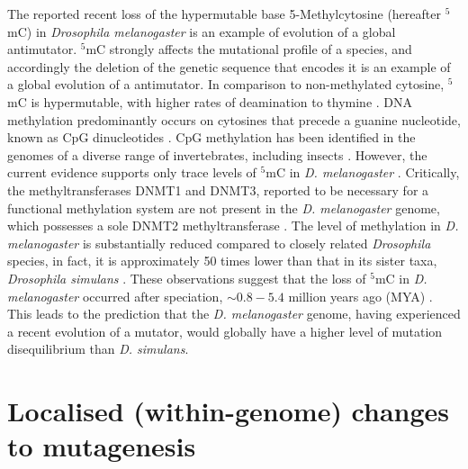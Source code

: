 The reported recent loss of the hypermutable base 5-Methylcytosine (hereafter $^5$mC) in \textit{Drosophila melanogaster} is an example of evolution of a global antimutator. 
$^5$mC strongly affects the mutational profile of a species, and accordingly the deletion of the genetic sequence that encodes it is an example of a global evolution of a antimutator. In comparison to non-methylated cytosine, $^5$mC is hypermutable, with higher rates of deamination to thymine \citep{Coulondre1978MolecularColi}. DNA methylation predominantly occurs on cytosines that precede a guanine nucleotide, known as CpG dinucleotides \citep{Holliday1975DNADevelopment}. CpG methylation has been identified in the genomes of a diverse range of invertebrates, including insects \citep{Wang2010EstimatingLoci}. However, the current evidence supports only trace levels of $^5$mC in \textit{D. melanogaster} \citep{Capuano2014CytosineSpecies, Deshmukh2018LevelsGenome}. Critically, the methyltransferases DNMT1 and DNMT3, reported to be necessary for a functional methylation system are not present in the \textit{D. melanogaster} genome, which possesses a sole DNMT2 methyltransferase \citep{Goll2005EukaryoticMethyltransferases, Tweedie1999VestigesMelanogaster}. The level of methylation in \textit{D. melanogaster} is substantially reduced compared to closely related \textit{Drosophila} species, in fact, it is approximately 50 times lower than that in its sister taxa, \textit{Drosophila simulans} \citep{Deshmukh2018LevelsGenome}. These observations suggest that the loss of $^5$mC in \textit{D. melanogaster} occurred after speciation, $\sim 0.8-5.4$ million years ago (MYA) \citep{Cutter2008DivergenceRate, Wang2010EstimatingLoci, Tamura2004TemporalClocks}. This leads to the prediction that the \textit{D. melanogaster} genome, having experienced a recent evolution of a mutator, would globally have a higher level of mutation disequilibrium than \textit{D. simulans}. 

\section{Localised (within-genome) changes to mutagenesis}

